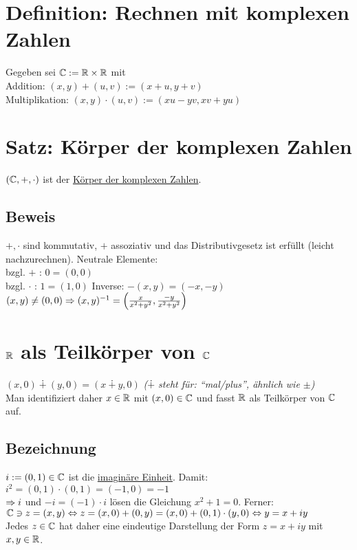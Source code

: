 \section{Definition: Rechnen mit komplexen Zahlen}\label{6.1}
Gegeben sei $\mathbb{C} := \mathbb{R} \times \mathbb{R}$ mit\\
Addition: $(x,y)+(u,v) := (x+u,y+v)$\\
Multiplikation: $(x,y)\cdot(u,v) := (xu-yv,xv+yu)$

\section{Satz: Körper der komplexen Zahlen}\label{6.2}
$(\mathbb{C}, +, \cdot)$ ist der \underline{Körper der komplexen Zahlen}.

\subsection*{Beweis}
$+, \cdot$ sind kommutativ, $+$ assoziativ und das Distributivgesetz ist erfüllt (leicht nachzurechnen).\nl
Neutrale Elemente:\\
bzgl. $+$ : $0 = (0,0)$\\
bzgl. $\cdot$ : $1 = (1,0)$\nl
Inverse: $-(x,y)=(-x,-y)$\\
$(x,y) \neq (0,0) \Rightarrow (x,y)^{-1} = \left( \frac{x}{x^2+y^2}, \frac{-y}{x^2+y^2} \right)$

\newpage

\section*{$\mathbb{R}$ als Teilkörper von $\mathbb{C}$}
$(x,0) \dotplus (y,0) = (x \dotplus y, 0)$ \emph{($\dotplus$ steht für: ``mal/plus'', ähnlich wie $\pm$)}\\
Man identifiziert daher $x \in \mathbb{R}$ mit $(x,0) \in \mathbb{C}$ und fasst $\mathbb{R}$ als Teilkörper von $\mathbb{C}$ auf.

\subsection*{Bezeichnung}
$i := (0,1) \in \mathbb{C}$ ist die \underline{imaginäre Einheit}.
Damit: $i^2 = (0,1) \cdot (0,1) = (-1,0) = -1$\\
$\Rightarrow i$ und $-i = (-1) \cdot i$ lösen die Gleichung $x^2+1=0$.\nl
Ferner: $\mathbb{C} \ni z = (x,y) \Leftrightarrow z = (x,0)+(0,y) = (x,0)+(0,1) \cdot (y,0) \Leftrightarrow y=x+iy$\\
Jedes $z \in \mathbb{C}$ hat daher eine eindeutige Darstellung der Form $z = x+iy$ mit $x,y \in \mathbb{R}$.

